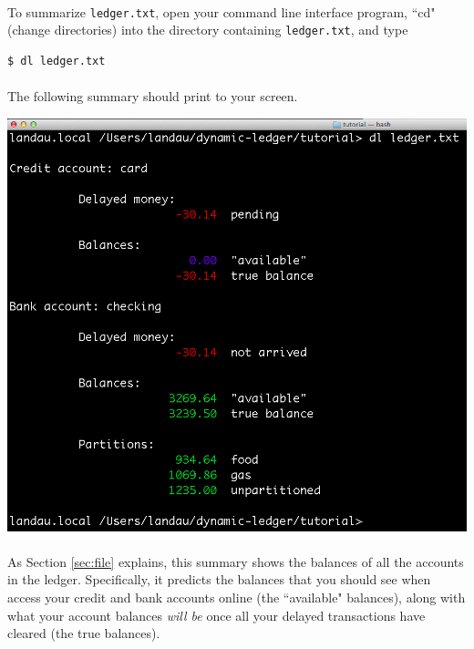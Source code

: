 \documentclass{article}
\begin{document}
\begin{flushleft}
\paragraph{} To summarize {\tt ledger.txt}, open your command line interface program, ``cd" (change directories) into the directory containing {\tt ledger.txt}, and type

\begin{lstlisting}
$ dl ledger.txt
\end{lstlisting} 

\paragraph{} The following summary should print to your screen.

\begin{center}
\includegraphics[scale=.45]{fig/usage0.png}
\end{center} 

\paragraph{} As Section \ref{sec:file} explains, this summary shows the balances of all the accounts in the ledger. Specifically, it predicts the balances that you should see when access your credit and bank accounts online (the ``available" balances), along with what your account balances \emph{will be} once all your delayed transactions have cleared (the true balances). 


\end{flushleft}
\end{document}
